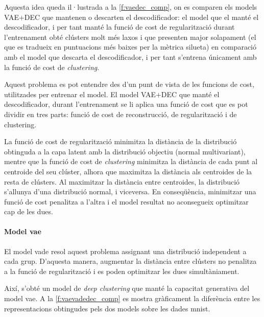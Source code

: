 \documentclass[CAT,BIB]{TFUOC}%
\begin{document}
        Aquesta idea queda il·lustrada a la \cref{f:vaedec_comp},
        on es comparen els models VAE+DEC que mantenen o descarten el descodificador:
        el model que el manté el descodificador,
        i per tant manté la funció de cost de regularització durant l'entrenament
        obté clústers molt més laxos i que presenten major solapament
        (el que es tradueix en puntuacions més baixes per la mètrica silueta)
        en comparació amb el model que descarta el descodificador,
        i per tant s'entrena únicament amb la funció de cost de \textit{clustering}.

        Aquest problema es pot entendre
        des d'un punt de vista de les funcions de cost,
        utilitzades per entrenar el model.
        El model VAE+DEC que manté el descodificador,
        durant l'entrenament se li aplica una funció de cost
        que es pot dividir en tres parts:
        funció de cost de reconstrucció,
        de regularització
        i de clustering.

        La funció de cost de regularització
        minimitza la distància de la distribució obtinguda a la capa latent
        amb la distribució objectiu (normal multivariant),
        mentre que la funció de cost de \textit{clustering}
        minimitza la distància de cada punt al centroide del seu clúster,
        alhora que maximitza la distància als centroides de la resta de clústers.
        Al maximitzar la distància entre centroides,
        la distribució s'allunya d'una distribució normal,
        i viceversa.
        En conseqüència, minimitzar una funció de cost penalitza a l'altra
        i el model resultat no aconsegueix optimitzar cap de les dues.


    \paragraph{Model \gls{vae}}

        El model \gls{vade} resol aquest problema
        assignant una distribució independent a cada grup.
        D'aquesta manera,
        augmentar la distància entre clústers
        no penalitza a la funció de regularització
        i es poden optimitzar les dues simultàniament.

        Així, s'obté un model de \textit{deep clustering}
        que manté la capacitat generativa del model \gls{vae}.
        A la \cref{f:vaevadedec_comp} es mostra gràficament
        la diferència entre les representacions obtingudes pels dos models
        sobre les dades \gls{mnist}.
\end{document}
